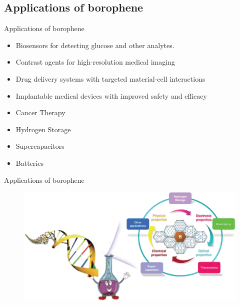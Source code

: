 \documentclass[handout,t]{beamer}
\begin{document}
\subsection{Applications of borophene}
\begin{frame}{Applications of borophene}
	\begin{itemize}
		\item Biosensors for detecting glucose and other analytes.
		\item Contrast agents for high-resolution medical imaging
		\item Drug delivery systems with targeted material-cell interactions
		\item Implantable medical devices with improved safety and efficacy
		\item Cancer Therapy
		\item Hydrogen Storage
		\item Supercapacitors
		\item Batteries
	\end{itemize}
\end{frame}
\begin{frame}{Applications of borophene}
	\begin{figure}[!h]
		\centering
		\includegraphics[width=\linewidth]{../figures/borophenedev.png}
		\label{fig:borophenedev}
	\end{figure}
\end{frame}
\end{document}
